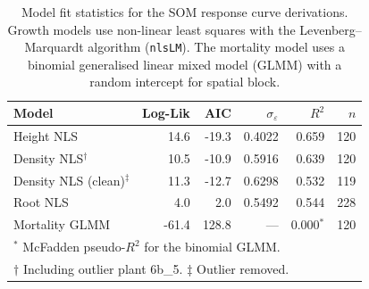 \begin{table}[htbp]
\centering
\caption{Model fit statistics for the SOM response curve derivations. Growth models use non-linear least squares with the Levenberg--Marquardt algorithm (\texttt{nlsLM}). The mortality model uses a binomial generalised linear mixed model (GLMM) with a random intercept for spatial block.}
\label{tab:model_fit_statistics}
\begin{tabular}{l r r r r r}
\toprule
Model & Log-Lik & AIC & $\sigma_\varepsilon$ & $R^2$ & $n$ \\
\midrule
Height NLS & 14.6 & -19.3 & 0.4022 & 0.659 & 120 \\
Density NLS$^\dagger$ & 10.5 & -10.9 & 0.5916 & 0.639 & 120 \\
Density NLS (clean)$^\ddagger$ & 11.3 & -12.7 & 0.6298 & 0.532 & 119 \\
Root NLS & 4.0 & 2.0 & 0.5492 & 0.544 & 228 \\
Mortality GLMM & -61.4 & 128.8 & --- & 0.000$^*$ & 120 \\
\bottomrule
\multicolumn{6}{l}{\footnotesize $^*$ McFadden pseudo-$R^2$ for the binomial GLMM.} \\
\multicolumn{6}{l}{\footnotesize $\dagger$ Including outlier plant 6b\_5. $\ddagger$ Outlier removed.} \\
\end{tabular}
\end{table}
